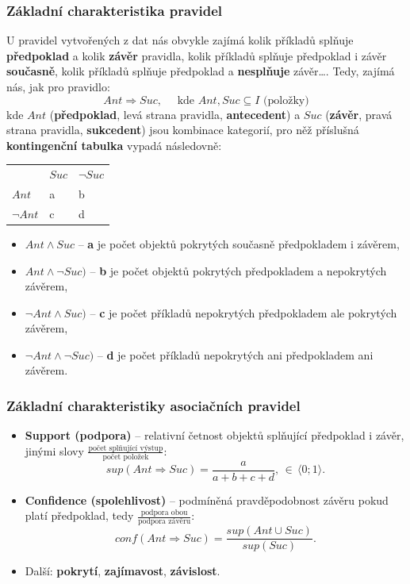 \subsubsection{Základní charakteristika pravidel}
U pravidel vytvořených z dat nás obvykle zajímá kolik příkladů splňuje \textbf{předpoklad} a kolik \textbf{závěr} pravidla, kolik příkladů splňuje předpoklad i závěr \textbf{současně}, kolik příkladů splňuje předpoklad a \textbf{nesplňuje} závěr…. Tedy, zajímá nás, jak pro pravidlo:
\begin{equation}
Ant \Rightarrow Suc, \quad\textrm{ kde } Ant, Suc \subseteq I \textrm{ (položky)}
\end{equation}
kde $ Ant $ (\textbf{předpoklad}, levá strana pravidla, \textbf{antecedent}) a $ Suc $ (\textbf{závěr}, pravá strana pravidla, \textbf{sukcedent}) jsou kombinace kategorií, pro něž příslušná \textbf{kontingenční tabulka} vypadá následovně:
\begin{table}[H]
	\centering
	\begin{tabular}{l|ll}
		&  $ Suc $ & $ \neg Suc $ \\\hhline
	$ Ant $	&a  & b \\
	$ \neg Ant $	& c & d
	\end{tabular}
\end{table}
\begin{itemize}
\item $Ant \land Suc$ -- \textbf{a} je počet objektů {pokrytých současně předpokladem i závěrem},
\item $Ant \land \neg Suc)$ -- \textbf{b} je počet objektů {pokrytých předpokladem a nepokrytých závěrem},
\item $\neg Ant \land Suc)$ -- \textbf{c} je počet příkladů {nepokrytých předpokladem ale pokrytých závěrem},
\item $\neg Ant \land \neg Suc)$ -- \textbf{d} je počet příkladů {nepokrytých ani předpokladem ani závěrem}. 
\end{itemize}

\subsubsection{Základní charakteristiky asociačních pravidel}
\begin{itemize}
\item \textbf{Support (podpora)} -- relativní četnost objektů splňující předpoklad i závěr, jinými slovy {\scriptsize$\frac{\textrm{počet splňující výstup}}{\textrm{počet položek}}$}:
\begin{equation}
sup(Ant \Rightarrow Suc) = \frac{a}{a + b + c + d}, \, \in \, \langle 0; 1 \rangle.
\end{equation}
\item \textbf{Confidence (spolehlivost)} -- podmíněná pravděpodobnost závěru pokud platí předpoklad, tedy {\scriptsize$\frac{\textrm{podpora obou}}{\textrm{podpora závěru}}$}:
\begin{equation}
conf(Ant \Rightarrow Suc) = \frac{sup(Ant \cup Suc)}{sup(Suc)}.
\end{equation}
\item Další: \textbf{pokrytí}, \textbf{zajímavost}, \textbf{závislost}.
\end{itemize}

